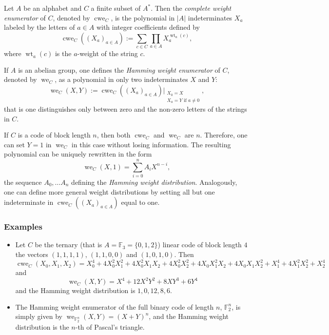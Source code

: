 \documentclass[12pt]{article}
\newcommand{\Prod}{\prod\limits}
\newcommand{\Sum}{\sum\limits}
\newcommand{\mbb}{\mathbb}
\DeclareMathOperator{\cwe}{cwe}
\DeclareMathOperator{\we}{we}
\DeclareMathOperator{\wt}{wt}
\begin{document}
Let $A$ be an alphabet and $C$ a finite subset of $A^*$.
Then the \emph{complete weight enumerator} of $C$, denoted by
$\cwe_C$, is the polynomial in $|A|$ indeterminates $X_a$ labeled by
the letters of $a\in A$ with integer coefficients defined by
\begin{equation*}
\cwe_C((X_a)_{a\in A}):=\Sum_{c\in C}\Prod_{a\in A}X_a^{\wt_a(c)},
\end{equation*}
where $\wt_a(c)$ is the $a$-weight of the string $c$.

If $A$ is an abelian group, one defines the \emph{Hamming weight
  enumerator} of $C$, denoted by $\we_C$, as a polynomial in only two
  indeterminates $X$ and $Y$:
\begin{equation*}
\we_C(X,Y):=\cwe_C((X_a)_{a\in A})\vert_{\begin{array}{l}\scriptstyle X_0=X\\\scriptstyle X_a=Y\text{ if
  }a\neq 0\end{array}},
\end{equation*}
that is one distinguishes only between zero and the non-zero letters
of the strings in $C$.

If $C$ is a code of block length $n$, then both $\cwe_C$ and $\we_C$
are  $n$. Therefore, one can set $Y=1$ in $\we_C$
in this case without losing information. The resulting polynomial can
be uniquely rewritten in the form
\begin{equation*}
\we_C(X,1)=\Sum_{i=0}^nA_iX^{n-i},
\end{equation*}
the sequence $A_0,\ldots A_n$ defining the \emph{Hamming weight
  distribution}. Analogously, one can define more general weight
  distributions by setting all but one indeterminate in
  $\cwe_C((X_a)_{a\in A})$ equal to one.

\subsubsection*{Examples}
\begin{itemize}
\item Let $C$ be the ternary (that is $A=\mbb{F}_3=\{0,1,2\}$) linear
  code of block length $4$  the vectors $(1,1,1,1)$, $(1,1,0,0)$
  and $(1,0,1,0)$. Then
\begin{equation*}
\cwe_C(X_0,X_1,X_2)=X_0^4+4X_0^2X_1^2+4X_0^2X_1X_2+4X_0^2X_2^2+4X_0X_1^2X_2+4X_0X_1X_2^2+X_1^4+4X_1^2X_2^2+X_2^4
\end{equation*}
and
\begin{equation*}
\we_C(X,Y)=X^4+12X^2Y^2+8XY^3+6Y^4
\end{equation*}
and the Hamming weight distribution is $1,0,12,8,6$.
\item The Hamming weight enumerator of the full binary code of length
  $n$, $\mbb{F}_2^n$, is simply given by
  $\we_{\mbb{F}_2^n}(X,Y)=(X+Y)^n$, and the Hamming weight
  distribution is the $n$-th  of Pascal's triangle.
\end{itemize}
\end{document}
